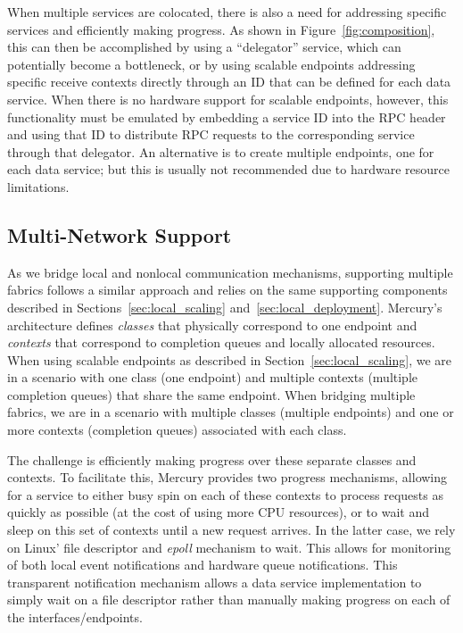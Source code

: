 \documentclass[11pt]{article}
\begin{document}
When multiple services are colocated, there is also a need for addressing specific services and 
efficiently making progress. 
%
As shown in Figure~\ref{fig:composition}, this can then be accomplished by
using a ``delegator'' service, which can potentially become a bottleneck,
or by using scalable endpoints addressing specific receive contexts
directly through an ID that can be defined for each data service.
%
When there is no hardware support for scalable endpoints, however, this
functionality must be emulated by embedding a service ID into the RPC
header and using that ID to distribute RPC requests to the corresponding
service through that delegator.  An alternative is to create multiple
endpoints, one for each data service; but this is usually not recommended
due to hardware resource limitations.

\subsection{Multi-Network Support}

As we bridge local and nonlocal communication mechanisms, supporting multiple
fabrics follows a similar approach and relies on the same supporting
components described in Sections~\ref{sec:local_scaling} 
and~\ref{sec:local_deployment}. Mercury's architecture defines \textit{classes}
that physically correspond to one endpoint and \textit{contexts} that correspond
to completion queues and locally allocated resources. When using scalable endpoints
as described in Section~\ref{sec:local_scaling}, we are in a scenario with one class
(one endpoint) and multiple contexts (multiple completion queues) that share the same
endpoint. When bridging multiple fabrics, we are in a scenario with multiple classes 
(multiple endpoints) and one or more contexts (completion queues) associated with
each class.

The challenge is efficiently making progress over these separate
classes and contexts. To facilitate this, Mercury provides two progress
mechanisms, allowing for a service to either
%
busy spin on each of these contexts to process requests as quickly as possible (at the cost
of using more CPU resources), or to
%
wait and sleep on this set of contexts until a new request arrives.
%
In the latter case, we rely on Linux' file descriptor and \textit{epoll}
mechanism to wait. This allows for monitoring of both local event
notifications and hardware queue notifications. This transparent
notification mechanism allows a data service implementation to
simply wait on a file descriptor rather than manually making progress
on each of the interfaces/endpoints.
\end{document}
